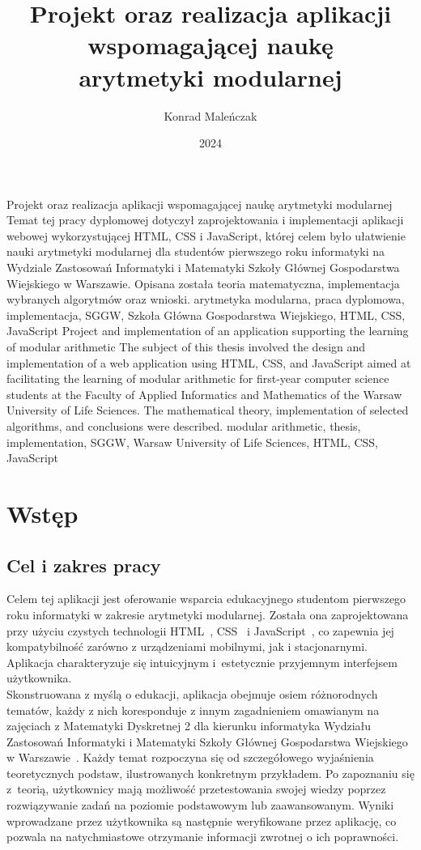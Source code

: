 \documentclass{SGGW-thesis}
\title{Projekt oraz realizacja aplikacji\\wspomagającej naukę\\arytmetyki modularnej}
\author{Konrad Maleńczak}
\date{2024}
\begin{document}
	\maketitle
	\statementpage
	\abstractpage
	{Projekt oraz realizacja aplikacji wspomagającej naukę arytmetyki modularnej}
	{Temat tej pracy dyplomowej dotyczył zaprojektowania i implementacji aplikacji webowej wykorzystującej HTML, CSS i JavaScript, której celem było ułatwienie nauki arytmetyki modularnej dla studentów pierwszego roku informatyki na Wydziale Zastosowań Informatyki i Matematyki Szkoły Głównej Gospodarstwa Wiejskiego w Warszawie. Opisana została teoria matematyczna, implementacja wybranych algorytmów oraz wnioski.}
	{arytmetyka modularna, praca dyplomowa, implementacja, SGGW, Szkoła Główna Gospodarstwa Wiejskiego, HTML, CSS, JavaScript}
	{Project and implementation of an application supporting the learning of modular arithmetic}
	{The subject of this thesis involved the design and implementation of a web application using HTML, CSS, and JavaScript aimed at facilitating the learning of modular arithmetic for first-year computer science students at the Faculty of Applied Informatics and Mathematics of the Warsaw University of Life Sciences. The mathematical theory, implementation of selected algorithms, and conclusions were described.}
	{modular arithmetic, thesis, implementation, SGGW, Warsaw University of Life Sciences, HTML, CSS, JavaScript}
	
	{
		\doublespacing
		\tableofcontents
	}
	
	\startchapterfromoddpage
	
	\chapter{Wstęp}
	\section{Cel i zakres pracy}
	Celem tej aplikacji jest oferowanie wsparcia edukacyjnego studentom pierwszego roku informatyki w zakresie arytmetyki modularnej. Została ona zaprojektowana przy użyciu czystych technologii HTML~\cite{html}, CSS~\cite{css} i JavaScript~\cite{js}, co zapewnia jej kompatybilność zarówno z urządzeniami mobilnymi, jak i stacjonarnymi. Aplikacja charakteryzuje się intuicyjnym i~estetycznie przyjemnym interfejsem użytkownika.
	\\
	Skonstruowana z myślą o edukacji, aplikacja obejmuje osiem różnorodnych tematów, każdy z nich koresponduje z innym zagadnieniem omawianym na zajęciach z Matematyki Dyskretnej 2 dla kierunku informatyka Wydziału Zastosowań Informatyki i Matematyki Szkoły Głównej Gospodarstwa Wiejskiego w Warszawie~\cite{ajakubiec}. Każdy temat rozpoczyna się od szczegółowego wyjaśnienia teoretycznych podstaw, ilustrowanych konkretnym przykładem. Po zapoznaniu się z~teorią, użytkownicy mają możliwość przetestowania swojej wiedzy poprzez rozwiązywanie zadań na poziomie podstawowym lub zaawansowanym. Wyniki wprowadzane przez użytkownika są następnie weryfikowane przez aplikację, co pozwala na natychmiastowe otrzymanie informacji zwrotnej o ich poprawności.
	\newpage
	
\end{document}
